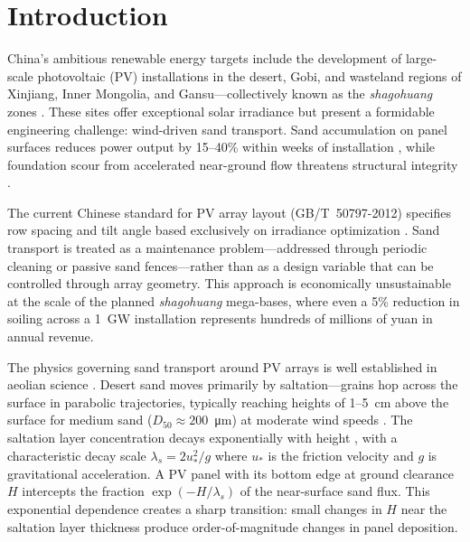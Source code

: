 \documentclass[preprint,12pt,review]{elsarticle}
\begin{document}
\linenumbers

\section{Introduction}
\label{sec:intro}

China's ambitious renewable energy targets include the development of large-scale photovoltaic (PV) installations in the desert, Gobi, and wasteland regions of Xinjiang, Inner Mongolia, and Gansu---collectively known as the \emph{shagohuang} zones \cite{tang2021aeolian}. These sites offer exceptional solar irradiance but present a formidable engineering challenge: wind-driven sand transport. Sand accumulation on panel surfaces reduces power output by 15--40\% within weeks of installation \cite{sarver2013comprehensive,ilse2019fundamentals}, while foundation scour from accelerated near-ground flow threatens structural integrity \cite{yue2021sand}.

The current Chinese standard for PV array layout (GB/T~50797-2012) specifies row spacing and tilt angle based exclusively on irradiance optimization \cite{gb50797}. Sand transport is treated as a maintenance problem---addressed through periodic cleaning or passive sand fences---rather than as a design variable that can be controlled through array geometry. This approach is economically unsustainable at the scale of the planned \emph{shagohuang} mega-bases, where even a 5\% reduction in soiling across a 1~GW installation represents hundreds of millions of yuan in annual revenue.

The physics governing sand transport around PV arrays is well established in aeolian science \cite{bagnold1941physics,shao2008physics,kok2012physics}. Desert sand moves primarily by saltation---grains hop across the surface in parabolic trajectories, typically reaching heights of 1--5~cm above the surface for medium sand ($D_{50} \approx 200$~\si{\micro\metre}) at moderate wind speeds \cite{owen1964saltation,werner1990steady}. The saltation layer concentration decays exponentially with height \cite{anderson1991review}, with a characteristic decay scale $\lambda_s = 2u_*^2/g$ where $u_*$ is the friction velocity and $g$ is gravitational acceleration. A PV panel with its bottom edge at ground clearance $H$ intercepts the fraction $\exp(-H/\lambda_s)$ of the near-surface sand flux. This exponential dependence creates a sharp transition: small changes in $H$ near the saltation layer thickness produce order-of-magnitude changes in panel deposition.
\end{document}
